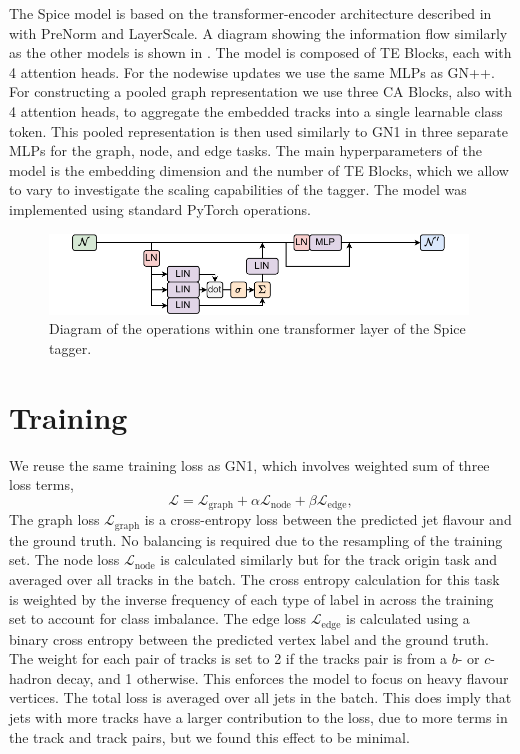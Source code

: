 The Spice model is based on the transformer-encoder architecture described in  with PreNorm and LayerScale.
A diagram showing the information flow similarly as the other models is shown in .
The model is composed of TE Blocks, each with 4 attention heads.
For the nodewise updates we use the same MLPs as GN++.
For constructing a pooled graph representation we use three CA Blocks, also with 4 attention heads, to aggregate the embedded tracks into a single learnable class token.
This pooled representation is then used similarly to GN1 in three separate MLPs for the graph, node, and edge tasks.
The main hyperparameters of the model is the embedding dimension and the number of TE Blocks, which we allow to vary to investigate the scaling capabilities of the tagger.
The model was implemented using standard PyTorch operations.

\begin{figure}[h!]
    \centering
    \includegraphics[width=0.99\textwidth]{figures/flavour_tagging/spice.pdf}
    \caption{Diagram of the operations within one transformer layer of the Spice tagger.}
    \label{fig:spice_graph}
\end{figure}

\section{Training}

We reuse the same training loss as GN1, which involves weighted sum of three loss terms,
\begin{equation}
    \mathcal{L} = \mathcal{L}_{\text{graph}} + \alpha \mathcal{L}_{\text{node}} + \beta \mathcal{L}_{\text{edge}},
\end{equation}
The graph loss $\mathcal{L}_{\text{graph}}$ is a cross-entropy loss between the predicted jet flavour and the ground truth.
No balancing is required due to the resampling of the training set.
The node loss $\mathcal{L}_{\text{node}}$ is calculated similarly but for the track origin task and averaged over all tracks in the batch.
The cross entropy calculation for this task is weighted by the inverse frequency of each type of label in  across the training set to account for class imbalance.
The edge loss $\mathcal{L}_{\text{edge}}$ is calculated using a binary cross entropy between the predicted vertex label and the ground truth.
The weight for each pair of tracks is set to 2 if the tracks pair is from a $b$- or $c$-hadron decay, and 1 otherwise.
This enforces the model to focus on heavy flavour vertices.
The total loss is averaged over all jets in the batch.
This does imply that jets with more tracks have a larger contribution to the loss, due to more terms in the track and track pairs, but we found this effect to be minimal.

